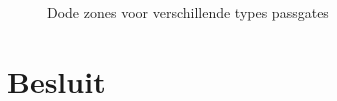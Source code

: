 \begin{figure}[!ht]
\caption{Dode zones voor verschillende types passgates}
\label{fig:passgate3}
\end{figure}



\section{Besluit}

